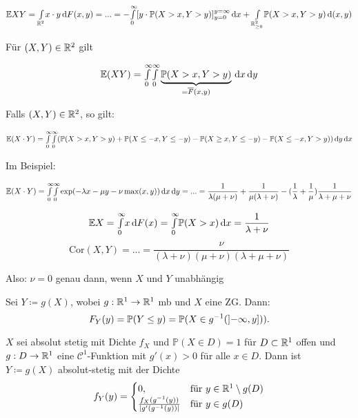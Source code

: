 \documentclass{cheat-sheet}
\renewcommand{\P}{\mathbb{P}} %
\newcommand{\E}{\mathbb{E}} %
\newcommand{\cor}{\mathrm{Cor}} %
\begin{document}
  \[ \E XY = \Int{\R^2}{}{x \cdot y}{F(x,y)} = ... = - \Int{0}{\infty}{[y \cdot \P(X > x, Y > y)]_{y=0}^{y=\infty}}{x} + \Int{\R_{\geq 0}^2}{}{\P(X > x, Y > y)}{(x,y)} \]

  Für $(X, Y) \in \mathbb{R}^2$ gilt

  \[ \E (XY) = \Int{0}{\infty}{\Int{0}{\infty}{\underbrace{\P(X > x, Y > y)}_{= \overline{F}(x,y)}}{x}}{y} \]

  Falls $(X, Y) \in \mathbb{R}^2$, so gilt:

  \[ \E (X \cdot Y) = \Int{0}{\infty}{\Int{0}{\infty}{(\P(X > x, Y > y) + \P(X \leq -x, Y \leq -y) - \P(X \geq x, Y \leq -y) - \P(X \leq -x, Y > y))}{y}}{x} \]

  Im Beispiel:

  \[ \E (X \cdot Y) = \Int{0}{\infty}{\Int{0}{\infty}{\exp(-\lambda x - \mu y - \nu \max(x,y))}{x}}{y} = ... = \frac{1}{\lambda (\mu + \nu)} + \frac{1}{\mu (\lambda + \nu)} - (\frac{1}{\lambda} + \frac{1}{\mu}) \frac{1}{\lambda + \mu + \nu} \]

  \[ \E X = \Int{0}{\infty}{x}{F(x)} = \Int{0}{\infty}{\P(X > x)}{x} = \frac{1}{\lambda + \nu} \]
  \[ \cor(X,Y) = ... = \frac{\nu}{(\lambda + \nu) (\mu + \nu) (\lambda + \mu + \nu)} \]

  Also: $\nu = 0$ genau dann, wenn $X$ und $Y$ unabhängig
\fi



\begin{satz}
  Sei $Y \coloneqq g(X)$, wobei $g : \mathbb{R}^1 \to \mathbb{R}^1$ mb und $X$ eine ZG. Dann:
  \[ F_Y(y) = \P(Y \leq y) = \P(X \in g^{-1}(\ocinterval{-\infty}{y})). \]
\end{satz}

\iffalse
  \[ F_Y(y) = \P(Y \leq y) = \P(Y \in \ointerval{-\infty}{y}) = \P(X \in g^{-1}(\ocinterval{-\infty}{y})) \]

  Beispiel: $Y = X^2$, $y \geq 0$

  $F_Y(y) = \P(X^2 \leq y) = \P(\abs{X} \leq \sqrt{y}) = \P(-\sqrt{y} \leq X \leq \sqrt{y}) = \P(X = -\sqrt{y}) + F_X(\sqrt{y}) - F_X(-\sqrt{y}) = F_X(\sqrt{y}) - \lim_{z \uparrow -\sqrt{y}} F_X(z)$
\fi

\begin{satz}
  $X$ sei absolut stetig mit Dichte $f_X$ und $\P(X \in D) = 1$ für $D \subset \mathbb{R}^1$ offen und $g : D \to \mathbb{R}^1$ eine $\mathcal{C}^1$-Funktion mit $g'(x) > 0$ für alle $x \in D$. Dann ist $Y \coloneqq g(X)$ absolut-stetig mit der Dichte
  \[
    f_Y(y) = \begin{cases}
      0, & \text{für } y \in \mathbb{R}^1 \setminus g(D) \\
      \tfrac{f_X(g^{-1}(y))}{\lvert g'(g^{-1}(y))\rvert} & \text{für } y \in g(D)
    \end{cases}
  \]
\end{satz}
\end{document}
